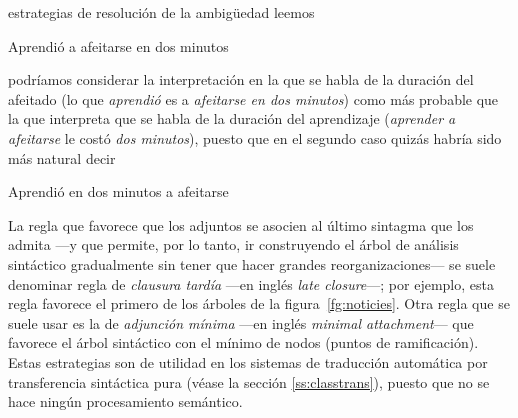 \begin{persabermes}{estrategias de resolución de la ambigüedad}
leemos \begin{exemple} Aprendió a afeitarse en dos minutos \end{exemple} podríamos considerar la interpretación en la que se habla de la duración del afeitado (lo que \emph{aprendió} es a \emph{afeitarse en dos minutos}) como más probable que la que interpreta que se habla de la duración del aprendizaje (\emph{aprender a afeitarse} le costó \emph{dos minutos}), puesto que en el segundo caso quizás habría sido más natural decir \begin{exemple} Aprendió en dos minutos a afeitarse \end{exemple} La regla que favorece que los adjuntos se asocien al último sintagma que los admita ---y que permite, por lo tanto, ir construyendo el árbol de análisis sintáctico gradualmente sin tener que hacer grandes reorganizaciones--- se suele denominar regla de \emph{clausura tardía} ---en inglés \emph{late closure}---; por ejemplo, esta regla favorece el primero de los árboles de la figura~\ref{fg:noticies}. Otra regla que se suele usar es la de \emph{adjunción mínima} ---en inglés \emph{minimal attachment}--- que favorece el árbol sintáctico con el mínimo de nodos (puntos de ramificación). Estas estrategias son de utilidad en los sistemas de traducción automática por transferencia sintáctica pura (véase la sección \ref{ss:classtrans}), puesto que no se hace ningún procesamiento semántico. 


\end{persabermes}
